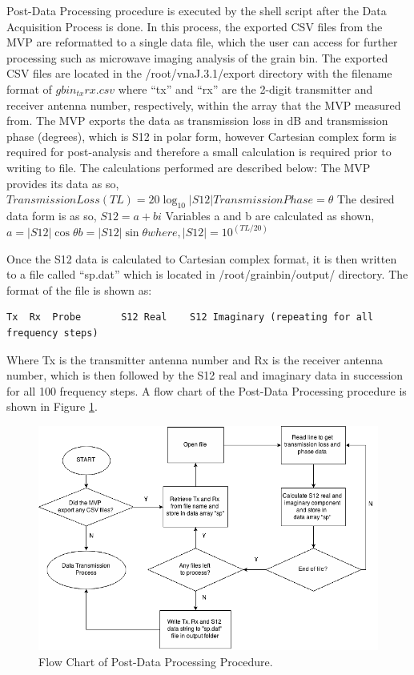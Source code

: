 Post-Data Processing procedure is executed by the shell script after the Data Acquisition Process is done.  In this process,
the exported CSV files from the MVP are reformatted to a single data file, which the user can access for further processing
such as microwave imaging analysis of the grain bin.  The exported CSV files are located in the
/root/vnaJ.3.1/export directory with the filename format of
$gbin_{tx}{rx}.csv$ where “{tx}” and “{rx}” are the 2-digit transmitter and receiver antenna number, respectively, within the
array that the MVP measured from. The MVP exports the data as transmission loss in dB and transmission phase (degrees), which
is S12 in polar form, however Cartesian complex form is required for post-analysis and therefore a small calculation is
required prior to writing to file. The calculations performed are described below:
\clearpage{}
\noindent
The MVP provides its data as so, 
\\$Transmission Loss (TL)=20\log_{10}|S12| Transmission Phase= \theta$
\noindent
The desired data form is as so, $S12=a+bi$
\noindent
Variables a and b are calculated as shown, 
\\$a=|S12|\cos\theta b=|S12|\sin\theta where,|S12|= 10^{(TL/20)}$

Once the S12 data is calculated to Cartesian complex format, it is then written to a file called “sp.dat” which is located in
/root/grainbin/output/ directory.  The format of the file is shown as:

\begin{verbatim}
Tx	Rx	Probe	    S12 Real	S12 Imaginary (repeating for all frequency steps)
\end{verbatim}

Where Tx is the transmitter antenna number and Rx is the receiver antenna number, which is then followed by the S12 real and
imaginary data in succession for all 100 frequency steps.  A flow chart of the Post-Data Processing procedure is shown in Figure
\ref{fig:pdp}.


\begin{figure}[h]
\begin{center}
\includegraphics[width=5in]{./images/pdp.png}
\caption{Flow Chart of Post-Data Processing
Procedure.}
\label{fig:pdp}
\end{center}
\end{figure}

